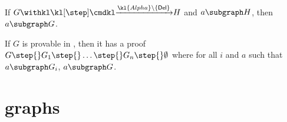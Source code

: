 \begin{scope}
\begin{fact}
  If $G \xstep{\kl{Alpha} \setminus \{\mathsf{Del}\}} H$ and $a \subgraph H$,
  then $a \subgraph G$.
\end{fact}

\begin{corollary}[Analyticity]
  If $G$ is provable in , then it has a proof $G \step{} G_1 \step{}
  \ldots \step{} G_n \step{} \emptyset$ where for all $i$ and $a$ such that $a
  \subgraph G_i$, $a \subgraph G$.
\end{corollary}



\end{scope}


\section{ graphs}

